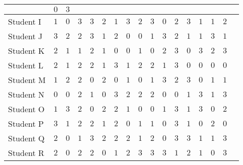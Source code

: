 \documentclass[11pt]{article}
\begin{document}
\begin{table}
\begin{tabular}{|a|p{.7cm}|p{.7cm}|p{.7cm}|p{.7cm}|p{.7cm}|p{.7cm}|p{.7cm}|p{.7cm}|p{.7cm}|p{.7cm}|p{.7cm}|p{.7cm}|p{.7cm}|c|p{.7cm}|p{.7cm}|}
& $0$ & $3$ \\ \hline
Student I & $1$ & $0$ & $3$ & $3$ & $2$ & $1$
& $3$ & $2$ & $3$ & $0$ & $2$ & $3$ & $1$
& $1$ & $2$ \\ \hline
Student J & $3$ & $2$ & $2$ & $3$ & $1$ & $2$
& $0$ & $0$ & $1$ & $3$ & $2$ & $1$ & $1$
& $3$ & $1$ \\ \hline
Student K & $2$ & $1$ & $1$ & $2$ & $1$ & $0$
& $0$ & $1$ & $0$ & $2$ & $3$ & $0$ & $3$
& $2$ & $3$ \\ \hline
Student L & $2$ & $1$ & $2$ & $2$ & $1$ & $3$
& $1$ & $2$ & $2$ & $1$ & $3$ & $0$ & $0$
& $0$ & $0$ \\ \hline
Student M & $1$ & $2$ & $2$ & $0$ & $2$ & $0$
& $1$ & $0$ & $1$ & $3$ & $2$ & $3$ & $0$
& $1$ & $1$ \\ \hline
Student N & $0$ & $0$ & $2$ & $1$ & $0$ & $3$
& $2$ & $2$ & $2$ & $0$ & $0$ & $1$ & $3$ & $1$ & $3$ \\ \hline
Student O & $1$ & $3$ & $2$ & $0$ & $2$ & $2$
& $1$ & $0$ & $0$ & $1$ & $3$ & $1$ & $3$
& $0$ & $2$ \\ \hline
Student P & $3$ & $1$ & $2$ & $2$ & $1$ & $2$
& $0$ & $1$ & $1$ & $0$ & $3$ & $1$ & $0$
& $2$ & $0$ \\ \hline
Student Q & $2$ & $0$ & $1$ & $3$ & $2$ & $2$
& $2$ & $1$ & $2$ & $0$ & $3$ & $3$ & $1$
& $1$ & $3$ \\ \hline
Student R & $2$ & $0$ & $2$ & $2$ & $0$ & $1$
& $2$ & $3$ & $3$ & $3$ & $1$ & $2$ & $1$
& $0$ & $3$ \\ \hline

\end{tabular}
\end{table}
\end{document}
